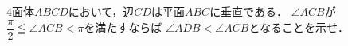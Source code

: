\documentclass[../../main.tex]{subfiles}
\begin{document}
4面体$ABCD$において，辺$CD$は平面$ABC$に垂直である．
$\angle ACB$が$\displaystyle \dfrac{\pi}{2} \leqq \angle ACB < \pi$を満たすならば
$\angle ADB < \angle ACB$となることを示せ．
\end{document}
